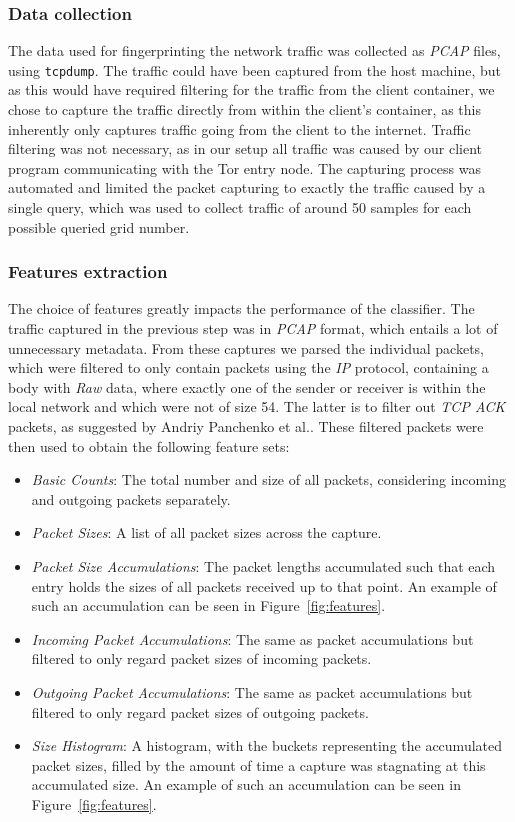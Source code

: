 \documentclass[9pt,conference]{IEEEtran}
\begin{document}
\subsubsection{Data collection}
The data used for fingerprinting the network traffic was collected as \textit{PCAP} files, using \texttt{tcpdump}\cite{tcpdump}. The traffic could have been captured from the host machine, but as this would have required filtering for the traffic from the client container, we chose to capture the traffic directly from within the client's container, as this inherently only captures traffic going from the client to the internet. Traffic filtering was not necessary, as in our setup all traffic was caused by our client program communicating with the Tor entry node. The capturing process was automated and limited the packet capturing to exactly the traffic caused by a single query, which was used to collect traffic of around 50 samples for each possible queried grid number.
\subsubsection{Features extraction}
The choice of features greatly impacts the performance of the classifier. The traffic captured in the previous step was in \textit{PCAP} format, which entails a lot of unnecessary metadata. From these captures we parsed the individual packets, which were filtered to only contain packets using the \textit{IP} protocol, containing a body with \textit{Raw} data, where exactly one of the sender or receiver is within the local network and which were not of size 54. The latter is to filter out \textit{TCP ACK} packets, as suggested by Andriy Panchenko et al.\cite{panchenko2011website}. These filtered packets were then used to obtain the following feature sets:
\begin{itemize}
    \item \textit{Basic Counts}: The total number and size of all packets, considering incoming and outgoing packets separately.
    \item \textit{Packet Sizes}: A list of all packet sizes across the capture.
    \item \textit{Packet Size Accumulations}: The packet lengths accumulated such that each entry holds the sizes of all packets received up to that point. An example of such an accumulation can be seen in Figure~\ref{fig:features}.
    \item \textit{Incoming Packet Accumulations}: The same as packet accumulations but filtered to only regard packet sizes of incoming packets.
    \item \textit{Outgoing Packet Accumulations}: The same as packet accumulations but filtered to only regard packet sizes of outgoing packets.
    \item \textit{Size Histogram}: A histogram, with the buckets representing the accumulated packet sizes, filled by the amount of time a capture was stagnating at this accumulated size. An example of such an accumulation can be seen in Figure~\ref{fig:features}.
\end{itemize}
\end{document}
